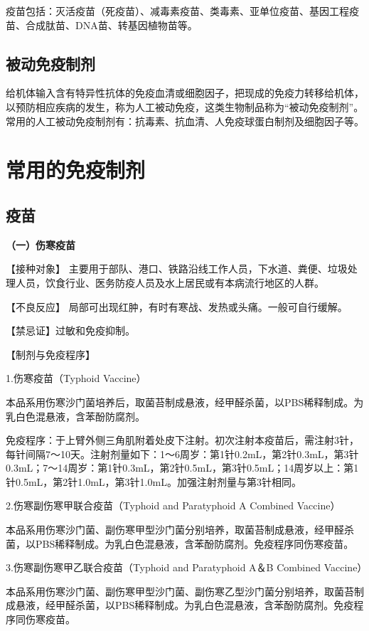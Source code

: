 疫苗包括：灭活疫苗（死疫苗）、减毒素疫苗、类毒素、亚单位疫苗、基因工程疫苗、合成肽苗、DNA苗、转基因植物苗等。


\subsection{被动免疫制剂}

给机体输入含有特异性抗体的免疫血清或细胞因子，把现成的免疫力转移给机体，以预防相应疾病的发生，称为人工被动免疫，这类生物制品称为“被动免疫制剂”。常用的人工被动免疫制剂有：抗毒素、抗血清、人免疫球蛋白制剂及细胞因子等。

\section{常用的免疫制剂}


\subsection{疫苗}

\textbf{（一）伤寒疫苗}

【接种对象】
主要用于部队、港口、铁路沿线工作人员，下水道、粪便、垃圾处理人员，饮食行业、医务防疫人员及水上居民或有本病流行地区的人群。

【不良反应】 局部可出现红肿，有时有寒战、发热或头痛。一般可自行缓解。

【禁忌证】过敏和免疫抑制。

【制剂与免疫程序】

1.伤寒疫苗（Typhoid Vaccine）

本品系用伤寒沙门菌培养后，取菌苔制成悬液，经甲醛杀菌，以PBS稀释制成。为乳白色混悬液，含苯酚防腐剂。

免疫程序：于上臂外侧三角肌附着处皮下注射。初次注射本疫苗后，需注射3针，每针间隔7～10天。注射剂量如下：1～6周岁：第1针0.2mL，第2针0.3mL，第3针0.3mL；7～14周岁：第1针0.3mL，第2针0.5mL，第3针0.5mL；14周岁以上：第1针0.5mL，第2针1.0mL，第3针1.0mL。加强注射剂量与第3针相同。

2.伤寒副伤寒甲联合疫苗（Typhoid and Paratyphoid A Combined Vaccine）

本品系用伤寒沙门菌、副伤寒甲型沙门菌分别培养，取菌苔制成悬液，经甲醛杀菌，以PBS稀释制成。为乳白色混悬液，含苯酚防腐剂。免疫程序同伤寒疫苗。

3.伤寒副伤寒甲乙联合疫苗（Typhoid and Paratyphoid A＆B Combined
Vaccine）

本品系用伤寒沙门菌、副伤寒甲型沙门菌、副伤寒乙型沙门菌分别培养，取菌苔制成悬液，经甲醛杀菌，以PBS稀释制成。为乳白色混悬液，含苯酚防腐剂。免疫程序同伤寒疫苗。

